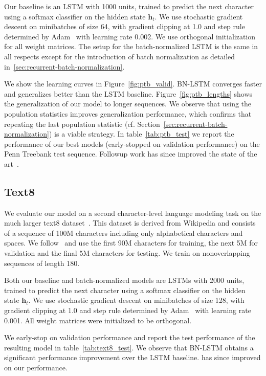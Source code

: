 \documentclass{article} %
\newcommand{\vect}[1]{\mathbf{#1}}
\begin{document}
Our baseline is an LSTM with 1000 units, trained to predict the next character
using a softmax classifier on the hidden state $\vect{h}_t$.  We use stochastic
gradient descent on minibatches of size 64, with gradient clipping at 1.0 and
step rule determined by Adam~\citep{kingma2014adam} with learning rate 0.002.
We use orthogonal initialization for all weight matrices.  The setup for the
batch-normalized LSTM is the same in all respects except for the introduction
of batch normalization as detailed in~\ref{sec:recurrent-batch-normalization}.

We show the learning curves in Figure~\ref{fig:ptb_valid}.  BN-LSTM converges
faster and generalizes better than the LSTM baseline.
Figure~\ref{fig:ptb_lengths} shows the generalization of our model to longer
sequences.  We observe that using the population statistics improves
generalization performance, which confirms that repeating the last population
statistic (cf. Section~\ref{sec:recurrent-batch-normalization}) is a viable
strategy.  In table~\ref{tab:ptb_test} we report the performance of our best
models (early-stopped on validation performance) on the Penn Treebank test
sequence.  Followup work has since improved the state of the
art~\citet{krueger2016zoneout,chung2016hierarchical,ha2016hypernetworks}.

\subsection{Text8}

We evaluate our model on a second character-level language modeling task on the
much larger text8 dataset~\citep{mahoney2009large}.  This dataset is derived
from Wikipedia and consists of a sequence of 100M characters including only
alphabetical characters and spaces.  We
follow~\citet{mikolov2012subword,zhang2016architectural} and use the first 90M
characters for training, the next 5M for validation and the final 5M characters
for testing.  We train on nonoverlapping sequences of length 180.

Both our baseline and batch-normalized models are LSTMs with 2000 units,
trained to predict the next character using a softmax classifier on the hidden
state $\vect{h}_t$. We use stochastic gradient descent on minibatches of size
128, with gradient clipping at 1.0 and step rule determined by
Adam~\citep{kingma2014adam} with learning rate 0.001.  All weight matrices were
initialized to be orthogonal.

We early-stop on validation performance and report the test performance of the
resulting model in table~\ref{tab:text8_test}.  We observe that BN-LSTM obtains
a significant performance improvement over the LSTM baseline.
\citep{chung2016hierarchical} has since improved on our performance.
\end{document}
